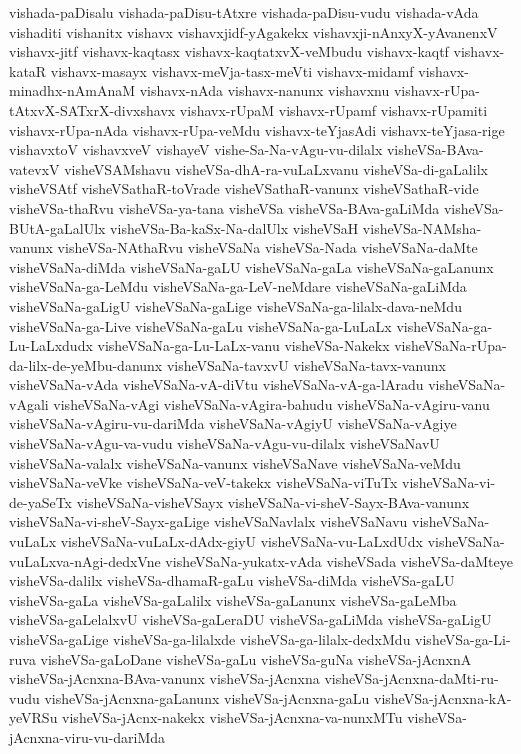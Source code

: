 {vishada-paDisalu
vishada-paDisu-tAtxre
vishada-paDisu-vudu
vishada-vAda
vishaditi
vishanitx
vishavx
vishavxjidf-yAgakekx
vishavxji-nAnxyX-yAvanenxV
vishavx-jitf
vishavx-kaqtasx
vishavx-kaqtatxvX-veMbudu
vishavx-kaqtf
vishavx-kataR
vishavx-masayx
vishavx-meVja-tasx-meVti
vishavx-midamf
vishavx-minadhx-nAmAnaM
vishavx-nAda
vishavx-nanunx
vishavxnu
vishavx-rUpa-tAtxvX-SATxrX-divxshavx
vishavx-rUpaM
vishavx-rUpamf
vishavx-rUpamiti
vishavx-rUpa-nAda
vishavx-rUpa-veMdu
vishavx-teYjasAdi
vishavx-teYjasa-rige
vishavxtoV
vishavxveV
vishayeV
vishe-Sa-Na-vAgu-vu-dilalx
visheVSa-BAva-vatevxV
visheVSAMshavu
visheVSa-dhA-ra-vuLaLxvanu
visheVSa-di-gaLalilx
visheVSAtf
visheVSathaR-toVrade
visheVSathaR-vanunx
visheVSathaR-vide
visheVSa-thaRvu
visheVSa-ya-tana
visheVSa
visheVSa-BAva-gaLiMda
visheVSa-BUtA-gaLalUlx
visheVSa-Ba-kaSx-Na-dalUlx
visheVSaH
visheVSa-NAMsha-vanunx
visheVSa-NAthaRvu
visheVSaNa
visheVSa-Nada
visheVSaNa-daMte
visheVSaNa-diMda
visheVSaNa-gaLU
visheVSaNa-gaLa
visheVSaNa-gaLanunx
visheVSaNa-ga-LeMdu
visheVSaNa-ga-LeV-neMdare
visheVSaNa-gaLiMda
visheVSaNa-gaLigU
visheVSaNa-gaLige
visheVSaNa-ga-lilalx-dava-neMdu
visheVSaNa-ga-Live
visheVSaNa-gaLu
visheVSaNa-ga-LuLaLx
visheVSaNa-ga-Lu-LaLxdudx
visheVSaNa-ga-Lu-LaLx-vanu
visheVSa-Nakekx
visheVSaNa-rUpa-da-lilx-de-yeMbu-danunx
visheVSaNa-tavxvU
visheVSaNa-tavx-vanunx
visheVSaNa-vAda
visheVSaNa-vA-diVtu
visheVSaNa-vA-ga-lAradu
visheVSaNa-vAgali
visheVSaNa-vAgi
visheVSaNa-vAgira-bahudu
visheVSaNa-vAgiru-vanu
visheVSaNa-vAgiru-vu-dariMda
visheVSaNa-vAgiyU
visheVSaNa-vAgiye
visheVSaNa-vAgu-va-vudu
visheVSaNa-vAgu-vu-dilalx
visheVSaNavU
visheVSaNa-valalx
visheVSaNa-vanunx
visheVSaNave
visheVSaNa-veMdu
visheVSaNa-veVke
visheVSaNa-veV-takekx
visheVSaNa-viTuTx
visheVSaNa-vi-de-yaSeTx
visheVSaNa-visheVSayx
visheVSaNa-vi-sheV-Sayx-BAva-vanunx
visheVSaNa-vi-sheV-Sayx-gaLige
visheVSaNavlalx
visheVSaNavu
visheVSaNa-vuLaLx
visheVSaNa-vuLaLx-dAdx-giyU
visheVSaNa-vu-LaLxdUdx
visheVSaNa-vuLaLxva-nAgi-dedxVne
visheVSaNa-yukatx-vAda
visheVSada
visheVSa-daMteye
visheVSa-dalilx
visheVSa-dhamaR-gaLu
visheVSa-diMda
visheVSa-gaLU
visheVSa-gaLa
visheVSa-gaLalilx
visheVSa-gaLanunx
visheVSa-gaLeMba
visheVSa-gaLelalxvU
visheVSa-gaLeraDU
visheVSa-gaLiMda
visheVSa-gaLigU
visheVSa-gaLige
visheVSa-ga-lilalxde
visheVSa-ga-lilalx-dedxMdu
visheVSa-ga-Li-ruva
visheVSa-gaLoDane
visheVSa-gaLu
visheVSa-guNa
visheVSa-jAcnxnA
visheVSa-jAcnxna-BAva-vanunx
visheVSa-jAcnxna
visheVSa-jAcnxna-daMti-ru-vudu
visheVSa-jAcnxna-gaLanunx
visheVSa-jAcnxna-gaLu
visheVSa-jAcnxna-kA-yeVRSu
visheVSa-jAcnx-nakekx
visheVSa-jAcnxna-va-nunxMTu
visheVSa-jAcnxna-viru-vu-dariMda
}

